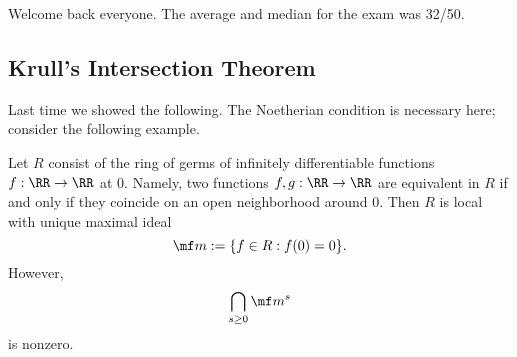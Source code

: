 
Welcome back everyone. The average and median for the exam was 32/50.

\subsection{Krull's Intersection Theorem}
Last time we showed the following.
\krullintersectii*
\noindent The Noetherian condition is necessary here; consider the following example.
\begin{exe}
	Let $R$ consist of the ring of germs of infinitely differentiable functions $f:\RR\to\RR$ at $0$. Namely, two functions $f,g:\RR\to\RR$ are equivalent in $R$ if and only if they coincide on an open neighborhood around $0$. Then $R$ is local with unique maximal ideal
	\[\mf m:=\{f\in R:f(0)=0\}.\]
	However,
	\[\bigcap_{s\ge0}\mf m^s\]
	is nonzero.
\end{exe}
